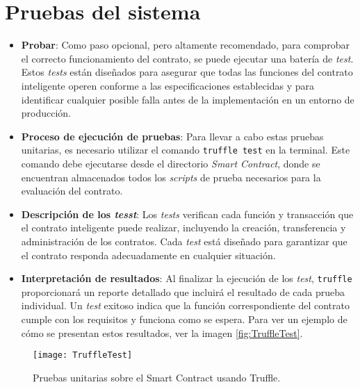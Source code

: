 \section{Pruebas del sistema}

\begin{itemize}

\item \textbf{Probar}: Como paso opcional, pero altamente recomendado, para comprobar el correcto funcionamiento del contrato, se puede ejecutar una batería de \textit{test}. Estos \textit{tests} están diseñados para asegurar que todas las funciones del contrato inteligente operen conforme a las especificaciones establecidas y para identificar cualquier posible falla antes de la implementación en un entorno de producción.
	
\item \textbf{Proceso de ejecución de pruebas}: Para llevar a cabo estas pruebas unitarias, es necesario utilizar el comando \texttt{truffle test} en la terminal. Este comando debe ejecutarse desde el directorio \textit{Smart Contract}, donde se encuentran almacenados todos los \textit{scripts} de prueba necesarios para la evaluación del contrato.

\item \textbf{Descripción de los \textit{tesst}}: 
Los \textit{tests} verifican cada función y transacción que el
contrato inteligente puede realizar, incluyendo la creación,
transferencia y administración de los contratos.
Cada \textit{test} está diseñado para garantizar que el contrato responda adecuadamente en cualquier situación.

\item \textbf{Interpretación de resultados}: Al finalizar la ejecución de los \textit{test}, \texttt{truffle} proporcionará un reporte detallado que incluirá el resultado de cada prueba individual.
Un \textit{test} exitoso indica que la función correspondiente del contrato cumple con los requisitos y funciona como se espera. 
Para ver un ejemplo de cómo se presentan estos resultados, ver la imagen \ref{fig:TruffleTest}.

\end{itemize}

\begin{figure}[h]
	\label{img:TruffleTest}
	\centering
	\texttt{[image: TruffleTest]}
	\caption[Pruebas sobre el contrato]{Pruebas unitarias sobre el Smart Contract usando Truffle.}
\end{figure}	

